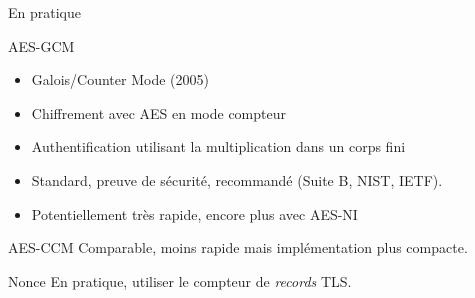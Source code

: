 \documentclass{mpg-ep-slides}
\begin{document}
\begin{frame}{En pratique}
  \begin{block}{AES-GCM}
    \begin{itemize}
      \item Galois/Counter Mode (2005)
      \item Chiffrement avec AES en mode compteur
      \item Authentification utilisant la multiplication dans un corps fini
      \item Standard, preuve de sécurité, recommandé (Suite B, NIST, IETF).
      \item Potentiellement très rapide, encore plus avec AES-NI
    \end{itemize}
  \end{block}

  \begin{block}{AES-CCM}
    Comparable, moins rapide mais implémentation plus compacte.
  \end{block}

  \begin{block}{Nonce}
    En pratique, utiliser le compteur de \emph{records} TLS.
  \end{block}
\end{frame}
\end{document}
